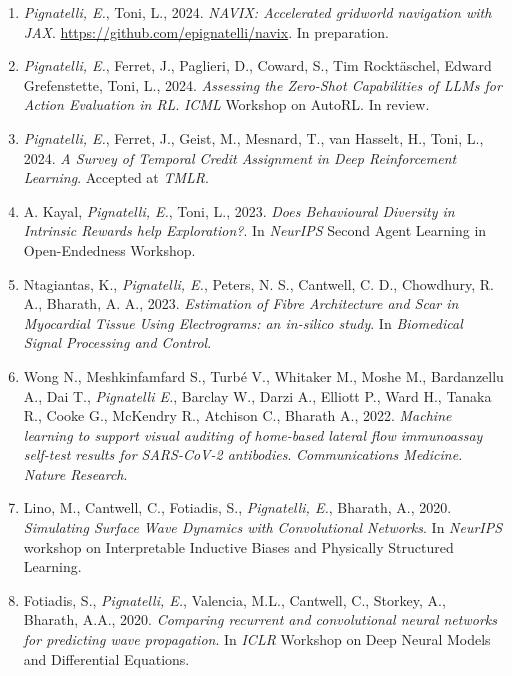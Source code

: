 \begin{publications}
    \begin{enumerate}[leftmargin=0.45cm, itemsep=0em, topsep=0.5em, parsep=0.2em]
        \item \emph{Pignatelli, E.}, Toni, L., 2024. \textit{NAVIX: Accelerated gridworld navigation with JAX}. \url{https://github.com/epignatelli/navix}. In preparation.
        \item \emph{Pignatelli, E.}, Ferret, J., Paglieri, D., Coward, S., Tim Rocktäschel, Edward Grefenstette, Toni, L., 2024. \textit{Assessing the Zero-Shot Capabilities of LLMs for Action Evaluation in RL}. \emph{ICML} Workshop on AutoRL. In review.
        \item \emph{Pignatelli, E.}, Ferret, J., Geist, M., Mesnard, T., van Hasselt, H., Toni, L., 2024. \textit{A Survey of Temporal Credit Assignment in Deep Reinforcement Learning}. Accepted at \emph{TMLR}.
        \item A. Kayal, \emph{Pignatelli, E.}, Toni, L., 2023. \textit{Does Behavioural Diversity in Intrinsic Rewards help Exploration?}. In \emph{NeurIPS} Second Agent Learning in Open-Endedness Workshop.
        \item Ntagiantas, K., \emph{Pignatelli, E.}, Peters, N. S., Cantwell, C. D., Chowdhury, R. A., Bharath, A. A., 2023. \textit{Estimation of Fibre Architecture and Scar in Myocardial Tissue Using Electrograms: an in-silico study}. In \textit{Biomedical Signal Processing and Control}.
        \item Wong N., Meshkinfamfard S., Turbé V., Whitaker M., Moshe M., Bardanzellu A., Dai T., \emph{Pignatelli E.}, Barclay W., Darzi A., Elliott P., Ward H., Tanaka R., Cooke G., McKendry R., Atchison C., Bharath A., 2022. \textit{Machine learning to support visual auditing of home-based lateral flow immunoassay self-test results for SARS-CoV-2 antibodies}. \emph{Communications Medicine. Nature Research}.
        \item Lino, M., Cantwell, C., Fotiadis, S., \emph{Pignatelli, E.}, Bharath, A., 2020. \textit{Simulating Surface Wave Dynamics with Convolutional Networks}. In \emph{NeurIPS} workshop on Interpretable Inductive Biases and Physically Structured Learning.
        \item Fotiadis, S., \emph{Pignatelli, E.}, Valencia, M.L., Cantwell, C., Storkey, A., Bharath, A.A., 2020. \textit{Comparing recurrent and convolutional neural networks for predicting wave propagation}. In \emph{ICLR} Workshop on Deep Neural Models and Differential Equations.

\end{enumerate}
\end{publications}
